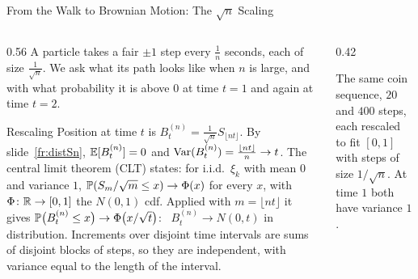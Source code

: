 \begin{frame}{From the Walk to Brownian Motion: The $\sqrt n$ Scaling}
  \label{fr:scaling}
  \small
  \begin{columns}[T]
    \begin{column}{0.56\textwidth}
      A particle takes a fair $\pm1$ step every $\tfrac1n$ seconds, each of size $\tfrac1{\sqrt n}$. We ask what its path looks like when $n$ is large, and with what probability it is above $0$ at time $t=1$ and again at time $t=2$.
      \begin{block}{Rescaling}
        Position at time $t$ is $B^{(n)}_t=\tfrac1{\sqrt n}S_{\lfloor nt\rfloor}$. By slide~\ref{fr:distSn}, $\mathbb{E}[B^{(n)}_t]=0$ and $\operatorname{Var}(B^{(n)}_t)=\tfrac{\lfloor nt\rfloor}{n}\to t$. The central limit theorem (CLT) states: for i.i.d.\ $\xi_k$ with mean $0$ and variance $1$, $\mathbb{P}(S_m/\sqrt m\le x)\to\Phi(x)$ for every $x$, with $\Phi\colon\mathbb{R}\to[0,1]$ the $N(0,1)$ cdf. Applied with $m=\lfloor nt\rfloor$ it gives $\mathbb{P}\big(B^{(n)}_t\le x\big)\to\Phi\big(x/\sqrt t\big)$: \ $B^{(n)}_t\to N(0,t)$ in distribution.
        Increments over disjoint time intervals are sums of disjoint blocks of steps, so they are independent, with variance equal to the length of the interval.
      \end{block}
    \end{column}
    \begin{column}{0.42\textwidth}
      \centering
      \par\smallskip
      {\footnotesize The same coin sequence, $20$ and $400$ steps, each rescaled to fit $[0,1]$ with steps of size $1/\sqrt n$. At time $1$ both have variance $1$.}
    \end{column}
  \end{columns}
\end{frame}


